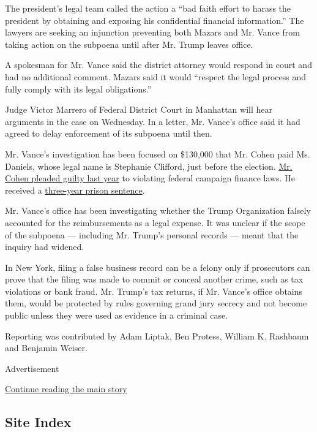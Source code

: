 The president's legal team called the action a ``bad faith effort to
harass the president by obtaining and exposing his confidential
financial information.'' The lawyers are seeking an injunction
preventing both Mazars and Mr. Vance from taking action on the subpoena
until after Mr. Trump leaves office.

A spokesman for Mr. Vance said the district attorney would respond in
court and had no additional comment. Mazars said it would ``respect the
legal process and fully comply with its legal obligations.''

Judge Victor Marrero of Federal District Court in Manhattan will hear
arguments in the case on Wednesday. In a letter, Mr. Vance's office said
it had agreed to delay enforcement of its subpoena until then.

Mr. Vance's investigation has been focused on \$130,000 that Mr. Cohen
paid Ms. Daniels, whose legal name is Stephanie Clifford, just before
the election.
\href{https://www.nytimes.com/2018/08/21/nyregion/michael-cohen-plea-deal-trump.html?module=inline}{Mr.
Cohen pleaded guilty last year} to violating federal campaign finance
laws. He received a
\href{https://www.nytimes.com/2018/12/12/nyregion/michael-cohen-sentence-trump.html?module=inline}{three-year
prison sentence}.

Mr. Vance's office has been investigating whether the Trump Organization
falsely accounted for the reimbursements as a legal expense. It was
unclear if the scope of the subpoena --- including Mr. Trump's personal
records --- meant that the inquiry had widened.

In New York, filing a false business record can be a felony only if
prosecutors can prove that the filing was made to commit or conceal
another crime, such as tax violations or bank fraud. Mr. Trump's tax
returns, if Mr. Vance's office obtains them, would be protected by rules
governing grand jury secrecy and not become public unless they were used
as evidence in a criminal case.

Reporting was contributed by Adam Liptak, Ben Protess, William K.
Rashbaum and Benjamin Weiser.

Advertisement

\protect\hyperlink{after-bottom}{Continue reading the main story}

\hypertarget{site-index}{%
\subsection{Site Index}\label{site-index}}

